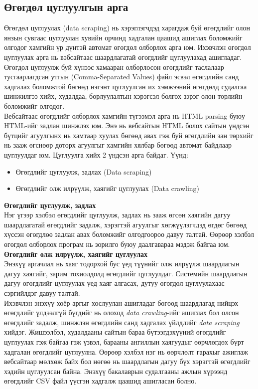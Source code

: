 \subsection{Өгөгдөл цуглуулгын арга}
Өгөгдөл цуглуулах (data scraping) нь хэрэглэгчдэд харагдаж буй өгөгдлийг олон янзын сувгаас цуглуулан хувийн орчинд хадгалан цаашид ашиглах боломжийг олгодог хамгийн үр дүнтэй автомат өгөгдөл олборлох арга юм. Ихэвчлэн өгөгдөл цуглуулах арга нь вэбсайтаас шаардлагатай өгөгдлийг цуглуулахад ашигладаг. Өгөгдөл цуглуулж буй хүнээс хамааран олборлосон өгөгдлийг таслалаар тусгаарлагдсан утгын (Comma-Separated Values) файл эсвэл өгөгдлийн санд хадгалах боломжтой бөгөөд нэгэнт цуглуулсан их хэмжээний өгөгдөлд судалгаа шинжилгээ хийх, худалдаа, борлуулалтын хэрэгсэл болгох зэрэг олон төрлийн боломжийг олгодог. 
\\ Вебсайтаас өгөгдлийг олборлох хамгийн түгээмэл арга нь HTML parsing буюу HTML-ийг задлан шинжлэх юм. Энэ нь вебсайтын HTML болох сайтын үндсэн бүтцийг агуулгынх нь хамтаар хуулах бөгөөд авах гэж буй өгөгдлийн зан төрхийг нь зааж өгснөөр доторх агуулгыг хамгийн хялбар бөгөөд автомат байдлаар цуглуулдаг юм. 
Цуглуулга хийх 2 үндсэн арга байдаг. Үүнд:
\begin{itemize}
  \item Өгөгдлийг цуглуулж, задлах (Data scraping)
  \item Өгөгдлийг олж илрүүлж, хаягийг цуглуулах (Data crawling)
\end{itemize}
\textbf{Өгөгдлийг цуглуулж, задлах}
\\Нэг үгээр хэлбэл өгөгдлийг цуглуулж, задлах нь зааж өгсөн хаягийн дагуу шаардлагатай өгөгдлийг задалж, хэрэгтэй агуулгыг хөгжүүлэгчдэд өгдөг бөгөөд хүссэн өгөгдлөө задлан авах боломжийг олгодгоороо давуу талтай. Өөрөөр хэлбэл өгөгдөл олборлох програм нь зорилго буюу даалгавараа мэдэж байгаа юм. 
\\\textbf{Өгөгдлийг олж илрүүлж, хаягийг цуглуулах}
\\Энэхүү аргачлал нь хаяг тодорхой бус үед түүнийг олж илрүүлж шаардлагын дагуу хаягийг, зарим тохиолдолд өгөгдлийг цуглуулдаг. Системийн шаардлагын дагуу өгөгдлийг цуглуулах үед хаяг алгасах, дутуу өгөгдөл цуглуулахаас сэргийлдэг давуу талтай. 
\\Ихэвчлэн энэхүү хоёр аргыг хослуулан ашигладаг бөгөөд шаардлагад нийцэх өгөгдлийг үлдээлгүй бүгдийг нь олоход \textit{data crawling}-ийг ашиглах бол олсон өгөгдлийг задалж, шинжлэн өгөгдлийн санд хадгалах үйлдлийг \textit{data scraping} хийдэг. Жишээлбэл, худалдааны сайтын бараа бүтээгдэхүүний өгөгдлийг цуглуулах гэж байгаа гэж үзвэл, барааны ангиллын хаягуудыг өөрчлөгдөх бүрт хадгалан өгөгдлийг цуглуулна. Өөрөөр хэлбэл нэг нь өөрчлөлт гарахыг ажиглаж вебсайтаар мөлхөж байх бол нөгөө нь шаардлагын дагуу бүх хэрэгтэй өгөгдлийг хэдийн цуглуулсан байна.  
Энэхүү бакалаврын судалгааны ажлын хүрээнд өгөгдлийг CSV файл үүсгэн хадгалж цаашид ашигласан болно. 
